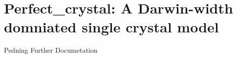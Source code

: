 \section{Perfect\_crystal: A Darwin-width domniated single crystal model}

\label{perfect_crystal}

Pedning Further Documetation
